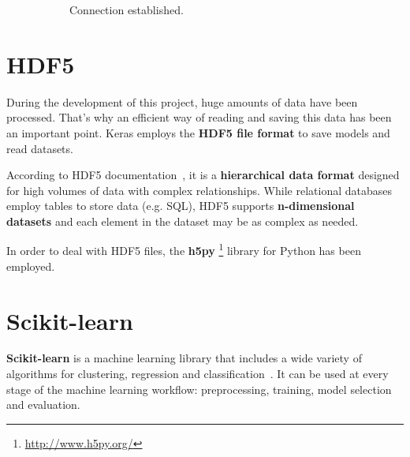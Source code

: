 \begin{figure}
\begin{subfigure}{0.33\textwidth}
		\caption{Connection established.}
		\label{fig:droidpost}
	\end{subfigure}
	\caption[DroidCam usage.]{}
	\label{fig:droidcam}
\end{figure}

\section{HDF5}\label{sec:hdf}
During the development of this project, huge amounts of data have been processed. That's why an efficient way of reading and saving this data has been an important point. Keras employs the \textbf{HDF5 file format} to save models and read datasets.

According to HDF5 documentation~\cite{hdf5}, it is a \textbf{hierarchical data format} designed for high volumes of data with complex relationships. While relational databases employ tables to store data (e.g. SQL), HDF5 supports \textbf{n-dimensional datasets} and each element in the dataset may be as complex as needed.

In order to deal with HDF5 files, the \textbf{h5py} \footnote{\url{http://www.h5py.org/}} library for Python has been employed.

\section{Scikit-learn}\label{sec:sklearn}
\textbf{Scikit-learn} is a machine learning library that includes a wide variety of algorithms for clustering, regression and classification~\cite{scikit-learn}. It can be used at every stage of the machine learning workflow: preprocessing, training, model selection and evaluation.


